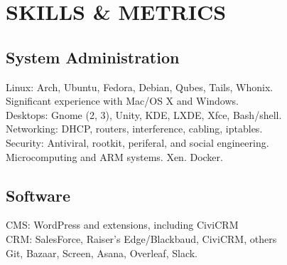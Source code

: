 
\section{SKILLS \& METRICS}
\begin{minipage}[t]{.5\textwidth}
    \subsection{System Administration}
		\textbullet{} Linux: Arch, Ubuntu, Fedora, Debian, Qubes, Tails, Whonix.\\
        \textbullet{} Significant experience with Mac/OS X and Windows. \\
   		\textbullet{} Desktops: Gnome (2, 3), Unity, KDE, LXDE, Xfce, Bash/shell. \\
    	\textbullet{} Networking: DHCP, routers, interference, cabling, iptables.\\
		\textbullet{} Security: Antiviral, rootkit, periferal, and social engineering.\\
        \textbullet{} Microcomputing and ARM systems. Xen. Docker.
    \sectionsep
    \subsection{Software}
        \textbullet{} CMS: WordPress and extensions, including CiviCRM \\
        \textbullet{} CRM: SalesForce, Raiser's Edge/Blackbaud, CiviCRM, others\\
        \textbullet{} Git, Bazaar, Screen, Asana, Overleaf, Slack.
\end{minipage}
\hfill
